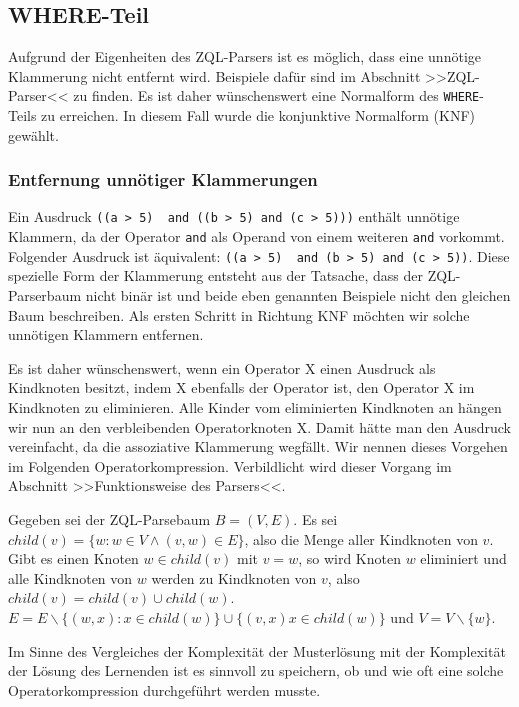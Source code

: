 \subsection{WHERE-Teil}

Aufgrund der Eigenheiten des ZQL-Parsers ist es möglich, dass eine unnötige Klammerung nicht entfernt wird. Beispiele dafür sind im Abschnitt >>ZQL-Parser<< zu finden. Es ist daher wünschenswert eine Normalform des \verb|WHERE|-Teils zu erreichen. In diesem Fall wurde die konjunktive Normalform (KNF) gewählt.


\subsubsection{Entfernung unnötiger Klammerungen}

Ein Ausdruck \verb|((a > 5)  and ((b > 5) and (c > 5)))| enthält unnötige Klammern, da der Operator \verb|and| als Operand von einem weiteren \verb|and| vorkommt. Folgender Ausdruck ist äquivalent: \verb|((a > 5)  and (b > 5) and (c > 5))|. Diese spezielle Form der Klammerung entsteht aus der Tatsache, dass der ZQL-Parserbaum nicht binär ist und beide eben genannten Beispiele nicht den gleichen Baum beschreiben. Als ersten Schritt in Richtung KNF möchten wir solche unnötigen Klammern entfernen. 

Es ist daher wünschenswert, wenn ein Operator X einen Ausdruck als Kindknoten besitzt, indem X ebenfalls der Operator ist, den Operator X im Kindknoten zu eliminieren. Alle Kinder vom eliminierten Kindknoten an hängen wir nun an den verbleibenden Operatorknoten X. Damit hätte man den Ausdruck vereinfacht, da die assoziative Klammerung wegfällt. Wir nennen dieses Vorgehen im Folgenden Operatorkompression. Verbildlicht wird dieser Vorgang im Abschnitt >>Funktionsweise des Parsers<<.

Gegeben sei der ZQL-Parsebaum $B=(V,E)$. Es sei $child(v) = \{ w : w\in V \wedge (v,w)\in E\}$, also die Menge aller Kindknoten von $v$. Gibt es einen Knoten $w\in child(v)$ mit $v=w$, so wird Knoten $w$ eliminiert und alle Kindknoten von $w$ werden zu Kindknoten von $v$, also $child(v) = child(v) \cup child(w)$. 
$E=E\backslash \{ (w,x) : x\in child(w)\} \cup \{(v,x) x\in child(w)\}$ und $V=V\backslash \{w\}$.

Im Sinne des Vergleiches der Komplexität der Musterlösung mit der Komplexität der Lösung des Lernenden ist es sinnvoll zu speichern, ob und wie oft eine solche Operatorkompression durchgeführt werden musste.

